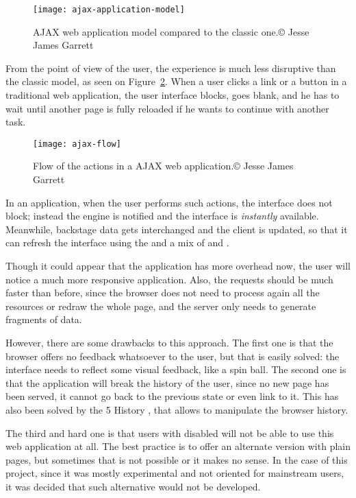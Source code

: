 \begin{figure}[htbp]
  \centering
    \texttt{[image: ajax-application-model]}
  \caption[AJAX web application model]{AJAX web application model compared to the classic one.\newline© Jesse James Garrett}
  \label{fig:ajax-application-model}
\end{figure}

From the point of view of the user, the experience is much less disruptive than the classic model, as seen on Figure~\ref{fig:ajax-flow}.
When a user clicks a link or a button in a traditional web application, the user interface blocks, goes blank, and he has to wait until another page is fully reloaded if he wants to continue with another task.

\begin{figure}[htbp]
  \centering
    \texttt{[image: ajax-flow]}
    \caption[AJAX flow]{Flow of the actions in a AJAX web application.\newline© Jesse James Garrett}
  \label{fig:ajax-flow}
\end{figure}

In an  application, when the user performs such actions, the interface does not block; instead the  engine is notified and the interface is \emph{instantly} available.
Meanwhile, backstage data gets interchanged and the client is updated, so that it can refresh the interface using the  and a mix of  and .

Though it could appear that the application has more overhead now, the user will notice a much more responsive application. Also, the requests should be much faster than before, since the browser does not need to process again all the resources or redraw the whole page, and the server only needs to generate fragments of data.

However, there are some drawbacks to this approach.
The first one is that the browser offers no feedback whatsoever to the user, but that is easily solved: the interface needs to reflect some visual feedback, like a spin ball.
The second one is that the application will break the history of the user, since no new page has been served, it cannot go back to the previous state or even link to it.
This has also been solved by the 5 History , that allows to manipulate the browser history.

The third and hard one is that users with  disabled will not be able to use this web application at all.
The best practice is to offer an alternate version with plain  pages, but sometimes that is not possible or it makes no sense.
In the case of this project, since it was mostly experimental and not oriented for mainstream users, it was decided that such alternative would not be developed.

